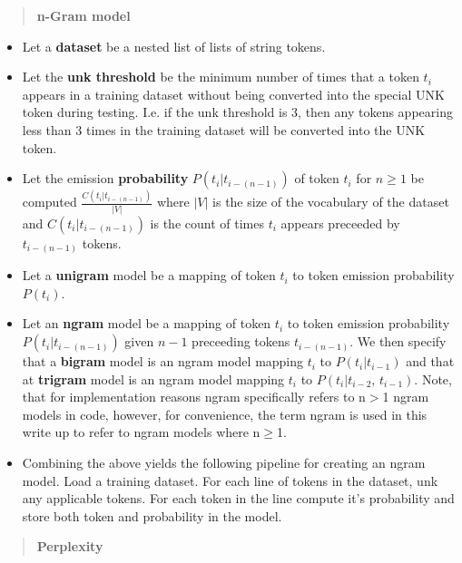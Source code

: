 \begin{quote}
    \textbf{n-Gram model}
\end{quote}

\begin{itemize}
    \item Let a \textbf{dataset} be a nested list of lists of string tokens.
    \item Let the \textbf{unk threshold} be the minimum number of times that a token $t_i$ appears in a training dataset without being converted into the special UNK token during testing. I.e. if the unk threshold is 3, then any tokens appearing less than 3 times in the training dataset will be converted into the UNK token.
    \item Let the emission \textbf{probability} $P(t_i \vert t_{i-(n-1)})$ of token $t_i$ for $n\geq1$ be computed $\frac{C\left(t_i \vert t_{i-(n-1)}\right)}{\lvert V \rvert}$ where $\lvert V \rvert$ is the size of the vocabulary of the dataset and $C\left(t_i \vert t_{i-(n-1)}\right)$ is the count of times $t_i$ appears preceeded by $t_{i-(n-1)}$ tokens.
    \item Let a \textbf{unigram} model be a mapping of token $t_i$ to token emission probability $P(t_i)$. 
    \item Let an \textbf{ngram} model be a mapping of token $t_i$ to token emission probability $P(t_i \vert t_{i-(n-1)})$ given $n-1$ preceeding tokens $t_{i-(n-1)}$. We then specify that a \textbf{bigram} model is an ngram model mapping $t_i$ to $P(t_i \vert t_{i-1})$ and that at \textbf{trigram} model is an ngram model mapping $t_i$ to $P(t_i \vert t_{i-2}, \, t_{i-1})$. Note, that for implementation reasons ngram specifically refers to n$>$1 ngram models in code, however, for convenience, the term ngram is used in this write up to refer to ngram models where n$\geq$1.
    \item Combining the above yields the following pipeline for creating an ngram model. Load a training dataset. For each line of tokens in the dataset, unk any applicable tokens. For each token in the line compute it's probability and store both token and probability in the model.
\end{itemize} 

\begin{quote}
    \textbf{Perplexity}
\end{quote}

